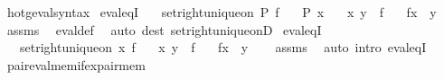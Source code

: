 \begin{isabellebody}
\isanewline
{}\isamarkupfalse%
\ hotg{\isacharunderscore}{\kern0pt}eval{\isacharunderscore}{\kern0pt}syntax\isanewline
\isanewline
{}\isamarkupfalse%
\ eval{\isacharunderscore}{\kern0pt}eqI{\isacharcolon}{\kern0pt}\isanewline
\ \ \ {\isachardoublequoteopen}set{\isacharunderscore}{\kern0pt}right{\isacharunderscore}{\kern0pt}unique{\isacharunderscore}{\kern0pt}on\ P\ f{\isachardoublequoteclose}\isanewline
\ \ \ {\isachardoublequoteopen}P\ x{\isachardoublequoteclose}\isanewline
\ \ \ {\isachardoublequoteopen}{\isasymlangle}x{\isacharcomma}{\kern0pt}\ y{\isasymrangle}\ {\isasymin}\ f{\isachardoublequoteclose}\isanewline
\ \ \ {\isachardoublequoteopen}f{\isacharbackquote}{\kern0pt}x\ {\isacharequal}{\kern0pt}\ y{\isachardoublequoteclose}\isanewline
%
\isadelimproof
\ \ %
\endisadelimproof
%
\isatagproof
{}\isamarkupfalse%
\ assms\ \isamarkupfalse%
\ eval{\isacharunderscore}{\kern0pt}def\ \isamarkupfalse%
\ {\isacharparenleft}{\kern0pt}auto\ dest{\isacharcolon}{\kern0pt}\ set{\isacharunderscore}{\kern0pt}right{\isacharunderscore}{\kern0pt}unique{\isacharunderscore}{\kern0pt}onD{\isacharparenright}{\kern0pt}%
\endisatagproof
{\isafoldproof}%
%
\isadelimproof
\isanewline
%
\endisadelimproof
\isanewline
{}\isamarkupfalse%
\ eval{\isacharunderscore}{\kern0pt}eqI{\isacharprime}{\kern0pt}{\isacharcolon}{\kern0pt}\isanewline
\ \ \ {\isachardoublequoteopen}set{\isacharunderscore}{\kern0pt}right{\isacharunderscore}{\kern0pt}unique{\isacharunderscore}{\kern0pt}on\ {\isacharbraceleft}{\kern0pt}x{\isacharbraceright}{\kern0pt}\ f{\isachardoublequoteclose}\isanewline
\ \ \ {\isachardoublequoteopen}{\isasymlangle}x{\isacharcomma}{\kern0pt}\ y{\isasymrangle}\ {\isasymin}\ f{\isachardoublequoteclose}\isanewline
\ \ \ {\isachardoublequoteopen}f{\isacharbackquote}{\kern0pt}x\ {\isacharequal}{\kern0pt}\ y{\isachardoublequoteclose}\isanewline
%
\isadelimproof
\ \ %
\endisadelimproof
%
\isatagproof
{}\isamarkupfalse%
\ assms\ \isamarkupfalse%
\ {\isacharparenleft}{\kern0pt}auto\ intro{\isacharcolon}{\kern0pt}\ eval{\isacharunderscore}{\kern0pt}eqI{\isacharparenright}{\kern0pt}%
\endisatagproof
{\isafoldproof}%
%
\isadelimproof
\isanewline
%
\endisadelimproof
\isanewline
{}\isamarkupfalse%
\ pair{\isacharunderscore}{\kern0pt}eval{\isacharunderscore}{\kern0pt}mem{\isacharunderscore}{\kern0pt}if{\isacharunderscore}{\kern0pt}ex{}{\isacharunderscore}{\kern0pt}pair{\isacharunderscore}{\kern0pt}mem{\isacharcolon}{\kern0pt}\isanewline

\end{isabellebody}
